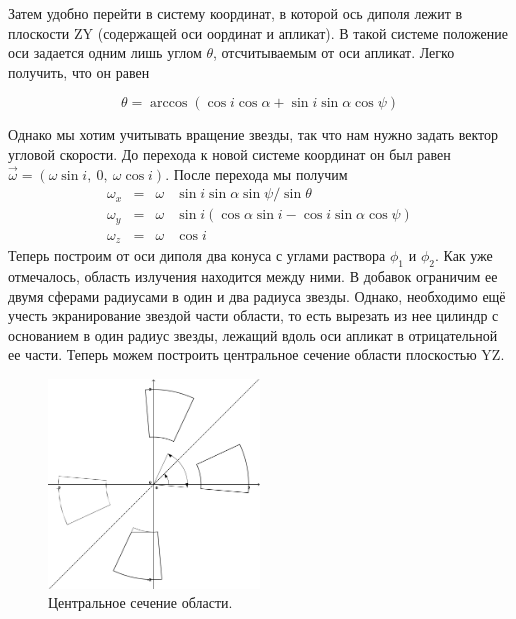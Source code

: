 \documentclass{article}
\begin{document}
Затем удобно перейти в систему координат, в которой ось диполя лежит в плоскости ZY (содержащей оси оординат и апликат). В такой системе положение оси задается одним лишь углом $\theta$, отсчитываемым от оси апликат. Легко получить, что он равен




\begin{equation}
\theta = \arccos (\cos i \cos \alpha + \sin i \sin \alpha \cos \psi)
\end{equation}


Однако мы хотим учитывать вращение звезды, так что нам нужно задать вектор угловой скорости. До перехода к новой системе координат он был равен $\overrightarrow{\omega} = (\omega \sin i,\ 0,\ \omega \cos i)$. После перехода мы получим
\begin{equation}
\begin{aligned}
\omega_x & = & \omega & \sin i \sin \alpha \sin \psi / \sin \theta \\
\omega_y & = & \omega & \sin i (\cos \alpha \sin i - \cos i \sin \alpha \cos \psi) \\
\omega_z & = & \omega & \cos i
\end{aligned}
\end{equation}
Теперь построим от оси диполя два конуса с углами раствора $\phi_1$ и $\phi_2$. Как уже отмечалось, область излучения находится между ними. В добавок ограничим ее двумя сферами радиусами в один и два радиуса звезды. Однако, необходимо ещё учесть экранирование звездой части области, то есть вырезать из нее цилиндр с основанием в один радиус звезды, лежащий вдоль оси апликат в отрицательной ее части. Теперь можем построить центральное сечение области плоскостью YZ. 

\begin{figure}[h]
	\centering
    \includegraphics[width=0.5\textwidth]{2d}
    \caption{Центральное сечение области.}
\end{figure}
\end{document}
